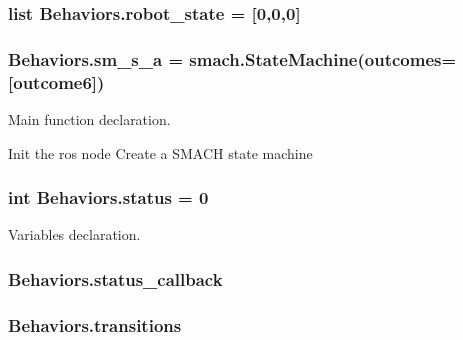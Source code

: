 \subsubsection[{\texorpdfstring{robot\+\_\+state}{robot_state}}]{\setlength{\rightskip}{0pt plus 5cm}list Behaviors.\+robot\+\_\+state = \mbox{[}0,0,0\mbox{]}}\hypertarget{namespaceBehaviors_a7fda1c0de76b996b876dad16ed5c7cf5}{}\label{namespaceBehaviors_a7fda1c0de76b996b876dad16ed5c7cf5}
\subsubsection[{\texorpdfstring{sm\+\_\+s\+\_\+a}{sm_s_a}}]{\setlength{\rightskip}{0pt plus 5cm}Behaviors.\+sm\+\_\+s\+\_\+a = smach.\+State\+Machine(outcomes=\mbox{[}\textquotesingle{}outcome6\textquotesingle{}\mbox{]})}\hypertarget{namespaceBehaviors_a8d923766f9ce0a45edee2abc4ddd7dfd}{}\label{namespaceBehaviors_a8d923766f9ce0a45edee2abc4ddd7dfd}


Main function declaration. 

Init the ros node Create a S\+M\+A\+CH state machine 
\subsubsection[{\texorpdfstring{status}{status}}]{\setlength{\rightskip}{0pt plus 5cm}int Behaviors.\+status = 0}\hypertarget{namespaceBehaviors_a7ea0e9c25ae327630daf14912540597f}{}\label{namespaceBehaviors_a7ea0e9c25ae327630daf14912540597f}


Variables declaration. 

\subsubsection[{\texorpdfstring{status\+\_\+callback}{status_callback}}]{\setlength{\rightskip}{0pt plus 5cm}Behaviors.\+status\+\_\+callback}\hypertarget{namespaceBehaviors_a151c2aa7ae62991aea8bc9a08e0e641b}{}\label{namespaceBehaviors_a151c2aa7ae62991aea8bc9a08e0e641b}
\subsubsection[{\texorpdfstring{transitions}{transitions}}]{\setlength{\rightskip}{0pt plus 5cm}Behaviors.\+transitions}\hypertarget{namespaceBehaviors_a37367cb6a42ce97b27fc6b024c7fe079}{}\label{namespaceBehaviors_a37367cb6a42ce97b27fc6b024c7fe079}


